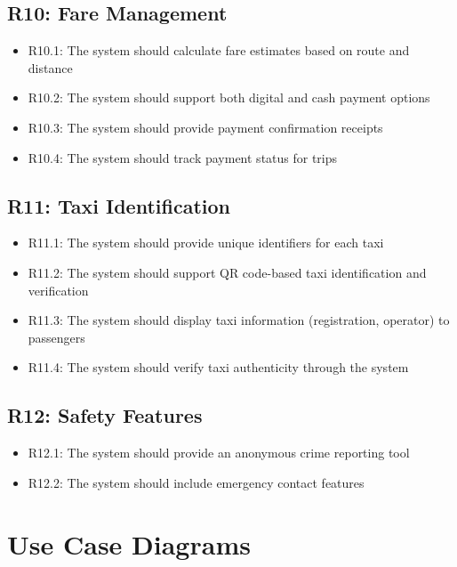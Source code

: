 \documentclass[a4paper,12pt]{article}
\begin{document}
\subsection*{R10: Fare Management}
\begin{itemize}
    \item R10.1: The system should calculate fare estimates based on route and distance
    \item R10.2: The system should support both digital and cash payment options
    \item R10.3: The system should provide payment confirmation receipts
    \item R10.4: The system should track payment status for trips
\end{itemize}

\subsection*{R11: Taxi Identification}
\begin{itemize}
    \item R11.1: The system should provide unique identifiers for each taxi
    \item R11.2: The system should support QR code-based taxi identification and verification
    \item R11.3: The system should display taxi information (registration, operator) to passengers
    \item R11.4: The system should verify taxi authenticity through the system
\end{itemize}

\subsection*{R12: Safety Features}
\begin{itemize}
    \item R12.1: The system should provide an anonymous crime reporting tool
    \item R12.2: The system should include emergency contact features
\end{itemize}

\section{Use Case Diagrams}
\end{document}
